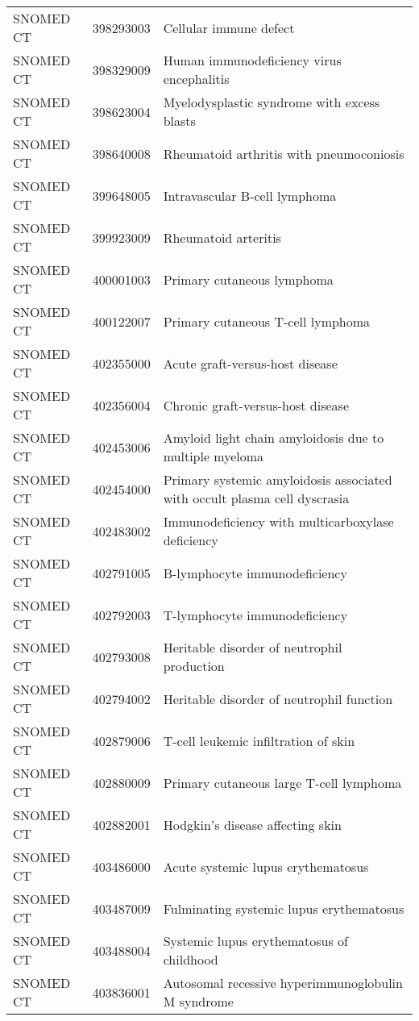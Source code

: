 \begin{table}[ht]
\begin{tabular}{lll}
  SNOMED CT & 398293003 & Cellular immune defect \\ 
  SNOMED CT & 398329009 & Human immunodeficiency virus encephalitis \\ 
  SNOMED CT & 398623004 & Myelodysplastic syndrome with excess blasts \\ 
  SNOMED CT & 398640008 & Rheumatoid arthritis with pneumoconiosis \\ 
  SNOMED CT & 399648005 & Intravascular B-cell lymphoma \\ 
  SNOMED CT & 399923009 & Rheumatoid arteritis \\ 
  SNOMED CT & 400001003 & Primary cutaneous lymphoma \\ 
  SNOMED CT & 400122007 & Primary cutaneous T-cell lymphoma \\ 
  SNOMED CT & 402355000 & Acute graft-versus-host disease \\ 
  SNOMED CT & 402356004 & Chronic graft-versus-host disease \\ 
  SNOMED CT & 402453006 & Amyloid light chain amyloidosis due to multiple myeloma \\ 
  SNOMED CT & 402454000 & Primary systemic amyloidosis associated with occult plasma cell dyscrasia \\ 
  SNOMED CT & 402483002 & Immunodeficiency with multicarboxylase deficiency \\ 
  SNOMED CT & 402791005 & B-lymphocyte immunodeficiency \\ 
  SNOMED CT & 402792003 & T-lymphocyte immunodeficiency \\ 
  SNOMED CT & 402793008 & Heritable disorder of neutrophil production \\ 
  SNOMED CT & 402794002 & Heritable disorder of neutrophil function \\ 
  SNOMED CT & 402879006 & T-cell leukemic infiltration of skin \\ 
  SNOMED CT & 402880009 & Primary cutaneous large T-cell lymphoma \\ 
  SNOMED CT & 402882001 & Hodgkin's disease affecting skin \\ 
  SNOMED CT & 403486000 & Acute systemic lupus erythematosus \\ 
  SNOMED CT & 403487009 & Fulminating systemic lupus erythematosus \\ 
  SNOMED CT & 403488004 & Systemic lupus erythematosus of childhood \\ 
  SNOMED CT & 403836001 & Autosomal recessive hyperimmunoglobulin M syndrome \\ 

\end{tabular}
\end{table}
